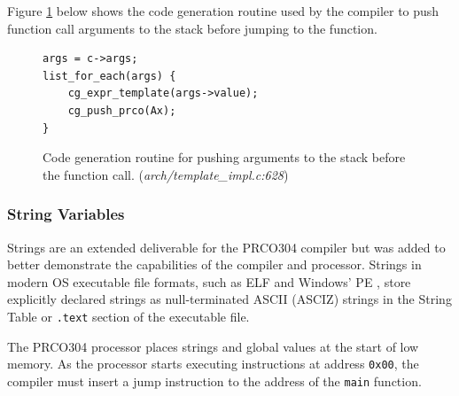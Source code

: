 \documentclass[11pt,a4paper]{report}
\newcommand{\scname}{PRCO304}
\begin{document}
Figure \ref{fig:compiler_cg_vars_args} below shows the code generation routine used by the compiler to push function call arguments to the stack before jumping to the function.

\begin{figure}[H]
\centering 
\begin{minipage}{0.4\textwidth}
\begin{verbatim}
args = c->args;
list_for_each(args) {
    cg_expr_template(args->value);
    cg_push_prco(Ax);
}
\end{verbatim}
\end{minipage}
\caption{Code generation routine for pushing arguments to the stack before the function call. (\textit{arch/template\_impl.c:628})}
\label{fig:compiler_cg_vars_args}
\end{figure}


\subsubsection*{String Variables}
Strings are an extended deliverable for the \scname{} compiler but was added to better demonstrate the capabilities of the compiler and processor. Strings in modern OS executable file formats, such as ELF \citep{elf_standard} and Windows' PE \citep {winpe_standard}, store explicitly declared strings as null-terminated ASCII (ASCIZ) strings in the String Table or \verb|.text| section of the executable file.

The \scname{} processor places strings and global values at the start of low memory. As the processor starts executing instructions at address \verb|0x00|, the compiler must insert a jump instruction to the address of the \verb|main| function.
\end{document}

